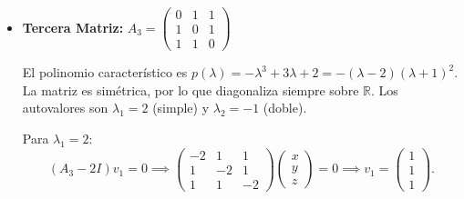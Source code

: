 {\begin{itemize}
\[\begin{pmatrix}
                1 & 0 \\
                2 & -1
            \end{pmatrix}
        \]
        \[
            = \begin{pmatrix}
                1 & 0 \\
                2 & -1
            \end{pmatrix} \begin{pmatrix}
                2 e^{-t} \sin t + e^{-t} \cos t & - e^{-t} \sin t \\
                2 e^{-t} \cos t - e^{-t} \sin t & - e^{-t} \cos t
            \end{pmatrix} = \begin{pmatrix}
                2 e^{-t} \sin t + e^{-t} \cos t & - e^{-t} \sin t \\
                4 e^{-t} \sin t + 2 e^{-t} \cos t - 2 e^{-t} \cos t + e^{-t} \sin t & - 2 e^{-t} \sin t + e^{-t} \cos t
            \end{pmatrix}
        \]
        Para hallar la solución general, multiplicamos $e^{tA}$ por un vector constante $C = \begin{pmatrix} C_1 \\ C_2 \end{pmatrix}$.
        \item \textbf{Tercera Matriz:} $A_3 = \begin{pmatrix} 0 & 1 & 1 \\ 1 & 0 & 1 \\ 1 & 1 & 0 \end{pmatrix}$
    
        El polinomio característico es $p(\lambda) = -\lambda^3 + 3\lambda + 2 = -(\lambda - 2)(\lambda + 1)^2$. La matriz es simétrica, por lo que diagonaliza siempre sobre $\mathbb{R}$. Los autovalores son $\lambda_1 = 2$ (simple) y $\lambda_2 = -1$ (doble).
        
        Para $\lambda_1 = 2$:
        \[
            (A_3 - 2I)v_1 = 0 \implies \begin{pmatrix} -2 & 1 & 1 \\ 1 & -2 & 1 \\ 1 & 1 & -2 \end{pmatrix}\begin{pmatrix} x \\ y \\ z \end{pmatrix} = 0 \implies v_1 = \begin{pmatrix} 1 \\ 1 \\ 1 \end{pmatrix}.
        \]
        

\end{itemize}}
